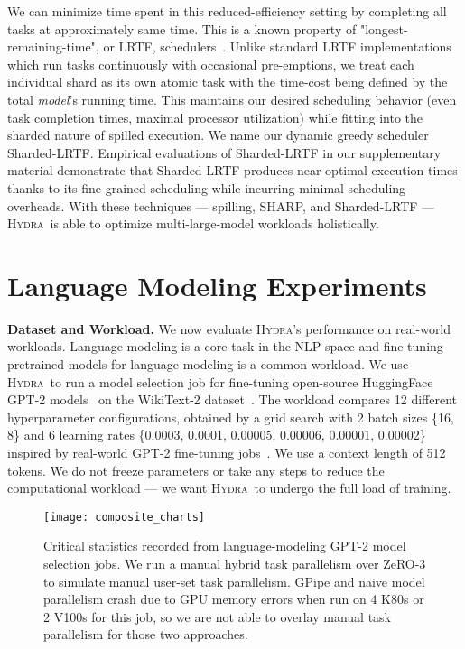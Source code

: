 \documentclass{article}
\newcommand{\system}{\textsc{Hydra}}
\begin{document}
{{We can minimize time spent in this reduced-efficiency setting by completing all tasks at approximately same time. This is a known property of "longest-remaining-time", or LRTF, schedulers~\cite{osbook}. Unlike standard LRTF implementations which run tasks continuously with occasional pre-emptions, we treat each individual shard as its own atomic task with the time-cost being defined by the total \textit{model}'s running time. This maintains our desired scheduling behavior (even task completion times, maximal processor utilization) while fitting into the sharded nature of spilled execution. We name our dynamic greedy scheduler Sharded-LRTF. Empirical evaluations of Sharded-LRTF in our supplementary material demonstrate that Sharded-LRTF produces near-optimal execution times thanks to its fine-grained scheduling while incurring minimal scheduling overheads. With these techniques --- spilling, SHARP, and Sharded-LRTF --- \system~is able to optimize multi-large-model workloads holistically.

\section{Language Modeling Experiments}
\label{sec:experiments}
\textbf{Dataset and Workload.} We now evaluate \system's performance on real-world workloads. Language modeling is a core task in the NLP space and fine-tuning pretrained models for language modeling is a common workload. We use \system~to run a model selection job for fine-tuning open-source HuggingFace GPT-2 models~\cite{huggingface} on the WikiText-2 dataset~\cite{wikitext2}. The workload compares 12 different hyperparameter configurations, obtained by a grid search with 2 batch sizes \{16, 8\} and 6 learning rates \{0.0003, 0.0001, 0.00005, 0.00006, 0.00001, 0.00002\} inspired by real-world GPT-2 fine-tuning jobs~\cite{hellogpt,gpt2portugal,huggingfaceexample,rutransformers}. We use a context length of 512 tokens. We do not freeze parameters or take any steps to reduce the computational workload --- we want \system~to undergo the full load of training.

\begin{figure}
\label{fig:charts}
  \centering
  \texttt{[image: composite\_charts]}
  \vspace{-4mm}
  \caption{Critical statistics recorded from language-modeling GPT-2 model selection jobs. We run a manual hybrid task parallelism over ZeRO-3 to simulate manual user-set task parallelism. GPipe and naive model parallelism crash due to GPU memory errors when run on 4 K80s or 2 V100s for this job, so we are not able to overlay manual task parallelism for those two approaches.}
\end{figure}

}}
\end{document}
